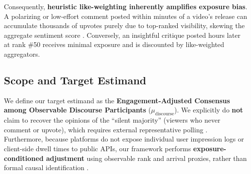 \documentclass[journal]{IEEEtran}
\begin{document}
Consequently, \textbf{heuristic like-weighting inherently amplifies exposure bias}. A polarizing or low-effort comment posted within minutes of a video's release can accumulate thousands of upvotes purely due to top-ranked visibility, skewing the aggregate sentiment score \cite{salganik2006experimental, muchnik2013social}. Conversely, an insightful critique posted hours later at rank \#50 receives minimal exposure and is discounted by like-weighted aggregators.

\subsection{Scope and Target Estimand}
We define our target estimand as the \textbf{Engagement-Adjusted Consensus among Observable Discourse Participants} ($\mu_{\text{discourse}}$). We explicitly do \textbf{not} claim to recover the opinions of the ``silent majority'' (viewers who never comment or upvote), which requires external representative polling \cite{zhao2025spiral, noelle1974spiral}. Furthermore, because platforms do not expose individual user impression logs or client-side dwell times to public APIs, our framework performs \textbf{exposure-conditioned adjustment} using observable rank and arrival proxies, rather than formal causal identification \cite{rosenbaum1983central, horvitz1952generalization}.
\end{document}
